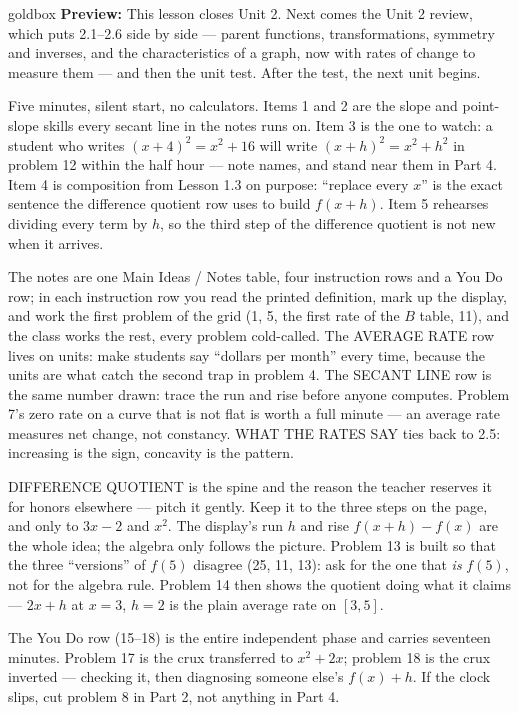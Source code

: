 \documentclass[10pt]{article}
\begin{document}
\begin{skillbox}{goldbox}
\textbf{Preview:} This lesson closes Unit 2. Next comes the Unit 2 review, which puts 2.1--2.6
side by side --- parent functions, transformations, symmetry and inverses, and the
characteristics of a graph, now with rates of change to measure them --- and then the unit
test. After the test, the next unit begins.
\end{skillbox}

\begin{teachernote}[Warm-Up]
Five minutes, silent start, no calculators. Items 1 and 2 are the slope and point-slope skills
every secant line in the notes runs on. Item 3 is the one to watch: a student who writes
$(x + 4)^2 = x^2 + 16$ will write $(x + h)^2 = x^2 + h^2$ in problem 12 within the half hour
--- note names, and stand near them in Part 4. Item 4 is composition from Lesson 1.3 on
purpose: ``replace every $x$'' is the exact sentence the difference quotient row uses to build
$f(x + h)$. Item 5 rehearses dividing every term by $h$, so the third step of the difference
quotient is not new when it arrives.
\end{teachernote}

\begin{teachernote}
The notes are one Main Ideas / Notes table, four instruction rows and a You Do row; in each
instruction row you read the printed definition, mark up the display, and work the first
problem of the grid (1, 5, the first rate of the $B$ table, 11), and the class works the rest,
every problem cold-called. The AVERAGE RATE row lives on units: make students say ``dollars
per month'' every time, because the units are what catch the second trap in problem 4. The
SECANT LINE row is the same number drawn: trace the run and rise before anyone computes.
Problem 7's zero rate on a curve that is not flat is worth a full minute --- an average rate
measures net change, not constancy. WHAT THE RATES SAY ties back to 2.5: increasing is the
sign, concavity is the pattern.

DIFFERENCE QUOTIENT is the spine and the reason the teacher reserves it for honors elsewhere ---
pitch it gently. Keep it to the three steps on the page, and only to $3x - 2$ and $x^2$. The
display's run $h$ and rise $f(x + h) - f(x)$ are the whole idea; the algebra only follows the
picture. Problem 13 is built so that the three ``versions'' of $f(5)$ disagree (25, 11, 13):
ask for the one that \emph{is} $f(5)$, not for the algebra rule. Problem 14 then shows the
quotient doing what it claims --- $2x + h$ at $x = 3$, $h = 2$ is the plain average rate on
$[3, 5]$.

The You Do row (15--18) is the entire independent phase and carries seventeen minutes. Problem
17 is the crux transferred to $x^2 + 2x$; problem 18 is the crux inverted --- checking it, then
diagnosing someone else's $f(x) + h$. If the clock slips, cut problem 8 in Part 2, not anything
in Part 4.
\end{teachernote}
\end{document}

